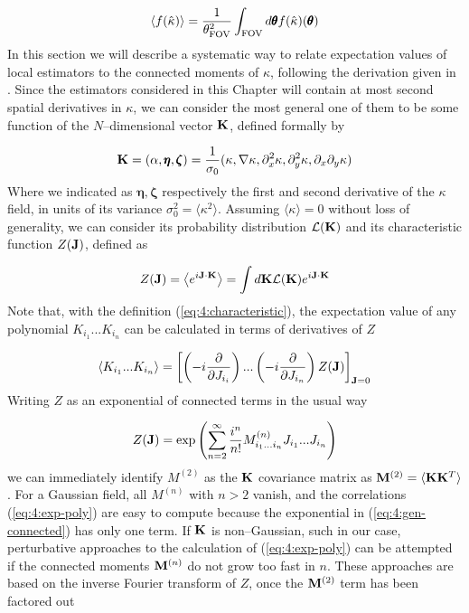 \begin{equation}
\label{eq:4:average-real}
\langle f(\hat{\kappa})\rangle = \frac{1}{\theta^2_{\rm FOV}}\int_{\rm FOV}d\pmb{\theta} f(\hat{\kappa})(\pmb{\theta}) 
\end{equation}
%
In this section we will describe a systematic way to relate expectation values of local estimators to the connected moments of $\kappa$, following the derivation given in \citep{MatsubaraLong}. Since the estimators considered in this Chapter will contain at most second spatial derivatives in $\kappa$, we can consider the most general one of them to be some function of the $N$--dimensional vector $\mathbf{K}$, defined formally by

\begin{equation}
\label{eq:4:lcl-vec}
\mathbf{K} = (\alpha,\pmb{\eta},\pmb{\zeta}) = \frac{1}{\sigma_0}(\kappa,\nabla \kappa,\partial^2_x\kappa,\partial^2_y\kappa,\partial_x\partial_y\kappa)
\end{equation}
%
Where we indicated as $\pmb{\eta},\pmb{\zeta}$ respectively the first and second derivative of the $\kappa$ field, in units of its variance $\sigma_0^2=\langle\kappa^2\rangle$. Assuming $\langle\kappa\rangle=0$ without loss of generality, we can consider its probability distribution $\mathcal{L}(\mathbf{K})$ and its characteristic function $Z(\mathbf{J})$, defined as 

\begin{equation}
\label{eq:4:characteristic}
Z(\mathbf{J}) = \left\langle e^{i\mathbf{J}\cdot\mathbf{K}}\right\rangle = \int d\mathbf{K}\mathcal{L}(\mathbf{K})e^{i\mathbf{J}\cdot\mathbf{K}}
\end{equation} 
%
Note that, with the definition (\ref{eq:4:characteristic}), the expectation value of any polynomial $K_{i_1}...K_{i_n}$ can be calculated in terms of derivatives of $Z$

\begin{equation}
\label{eq:4:exp-poly}
\left\langle K_{i_1}...K_{i_n}\right\rangle = \left[\left(-i\frac{\partial}{\partial J_{i_i}}\right)...\left(-i\frac{\partial}{\partial J_{i_n}}\right)Z(\mathbf{J})\right]_{\mathbf{J}=0}
\end{equation}
%
Writing $Z$ as an exponential of connected terms in the usual way

\begin{equation}
\label{eq:4:gen-connected}
Z(\mathbf{J}) = \exp\left(\sum_{n=2}^\infty\frac{i^n}{n!}M^{(n)}_{i_1...i_n}J_{i_1}...J_{i_n}\right)
\end{equation}
%
we can immediately identify $M^{(2)}$ as the $\mathbf{K}$ covariance matrix as $\mathbf{M}^{(2)}=\langle\mathbf{K}\mathbf{K}^T\rangle$. For a Gaussian field, all $M^{(n)}$ with $n>2$ vanish, and the correlations (\ref{eq:4:exp-poly}) are easy to compute because the exponential in (\ref{eq:4:gen-connected}) has only one term. If $\mathbf{K}$ is non--Gaussian, such in our case, perturbative approaches to the calculation of (\ref{eq:4:exp-poly}) can be attempted if the connected moments $\mathbf{M}^{(n)}$ do not grow too fast in $n$. These approaches are based on the inverse Fourier transform of $Z$, once the $\mathbf{M}^{(2)}$ term has been factored out


